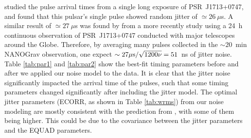 

\citet{sc12} studied the pulse arrival times from a single long exposure of
PSR~J1713+0747, and found that this pulsar's single pulse showed random jitter of
$\simeq26~\mu$s. 
A similar result of $\simeq27~\mu$s was found by \citet{dlc+14} from a more recently study using a 24~h continuous observation of PSR~J1713+0747 conducted with major telescopes around the Globe.
Therefore, by averaging many pulses collected in the
$\sim20$~min NANOGrav observation, one expect $\sim27\mu{\rm s}/\sqrt{1200\nu}=51$~ns of jitter noise. 
Table \ref{tab:par1} and \ref{tab:par2} show the best-fit timing parameters before and
after we applied our noise model to the data. It is clear that the jitter
noise significantly impacted the arrival time of the pulses, such that 
some timing parameters changed significantly after including the jitter model.
The optimal jitter parameters (ECORR, as shown in Table \ref{tab:wrms}) from
our noise modeling are mostly consistent with the prediction from
\citet{sc12}, with some of them being higher. This could be due to the
covariance between the jitter parameters and the EQUAD parameters.

